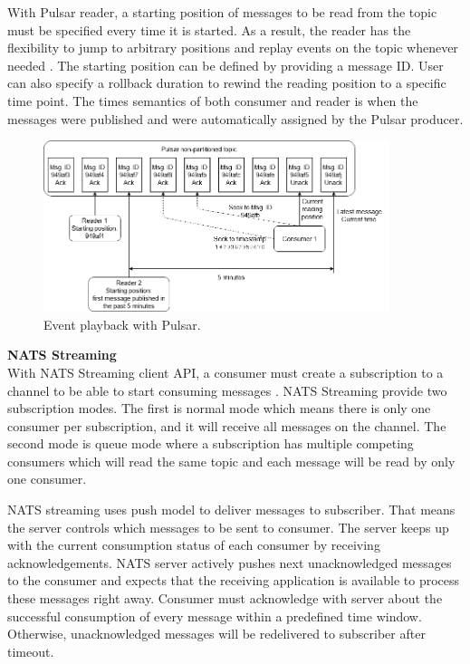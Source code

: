 With Pulsar reader, a starting position of messages to be read from the topic must be specified every time it is started. As a result, the reader has the flexibility to jump to arbitrary positions and replay events on the topic whenever needed \cite{pulsarreaderapi}. The starting position can be defined by providing a message ID. User can also specify a rollback duration to rewind the reading position to a specific time point. The times semantics of both consumer and reader is when the messages were published and were automatically assigned by the Pulsar producer.
\begin{figure}[h]
	\centering
	\includegraphics[width=\linewidth,height=5cm]{images/event-playback-pulsar.png}
	\caption{Event playback with Pulsar.}
	\label{fig:pulsareventplayback}
\end{figure}

\large \textbf{NATS Streaming}\\
\normalsize
With NATS Streaming client API, a consumer must create a subscription to a channel to be able to start consuming messages \cite{natssubscription}. NATS Streaming provide two subscription modes. The first is normal mode which means there is only one consumer per subscription, and it will receive all messages on the channel. The second mode is queue mode where a subscription has multiple competing consumers which will read the same topic and each message will be read by only one consumer. 

NATS streaming uses push model to deliver messages to subscriber. That means the server controls which messages to be sent to consumer. The server keeps up with the current consumption status of each consumer by receiving acknowledgements. NATS server actively pushes next unacknowledged messages to the consumer and expects that the receiving application is available to process these messages right away. Consumer must acknowledge with server about the successful consumption of every message within a predefined time window. Otherwise, unacknowledged messages will be redelivered to subscriber after timeout. 
 
